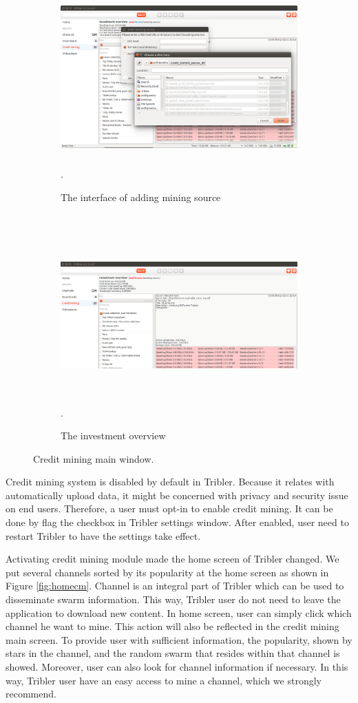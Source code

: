 \begin{figure}[t!]
	\begin{adjustwidth}{-2.5cm}{}
		\begin{subfigure}[t]{0.6\textwidth}
			\centering
			\includegraphics[width=\textwidth, height=6cm]{pics/add_source.png}
			\caption{The interface of adding mining source}.
			\label{fig:addsource}
		\end{subfigure}
		~
		\begin{subfigure}[t]{0.8\textwidth}
			\centering
			\includegraphics[width=\textwidth, height=6cm]{pics/overview_result.png}
			\caption{The investment overview}.
			\label{fig:overview}
		\end{subfigure}
		\caption{Credit mining main window.}
	\end{adjustwidth}
\end{figure}

Credit mining system is disabled by default in Tribler. Because it relates with automatically upload data, it might be concerned with privacy and security issue on end users. Therefore, a user must opt-in to enable credit mining. It can be done by flag the checkbox in Tribler settings window. After enabled, user need to restart Tribler to have the settings take effect. 

Activating credit mining module made the home screen of Tribler changed. We put several channels sorted by its popularity at the home screen as shown in Figure \ref{fig:homecm}. Channel is an integral part of Tribler which can be used to disseminate swarm information. This way, Tribler user do not need to leave the application to download new content. In home screen, user can simply click which channel he want to mine. This action will also be reflected in the credit mining main screen. To provide user with sufficient information, the popularity, shown by stars in the channel, and the random swarm that resides within that channel is showed. Moreover, user can also look for channel information if necessary. In this way, Tribler user have an easy access to mine a channel, which we strongly recommend.

